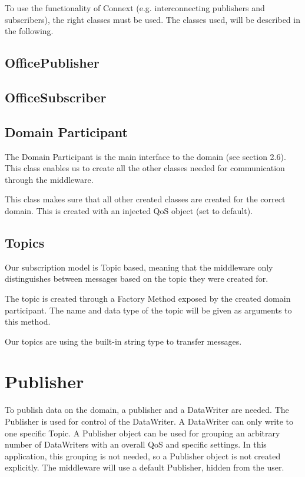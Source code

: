 To use the functionality of Connext (e.g. interconnecting publishers and subscribers), the right classes must be used. The classes used, will be described in the following. 

\subsection{OfficePublisher}

\subsection{OfficeSubscriber}

\subsection{Domain Participant}
The Domain Participant is the main interface to the domain (see section 2.6). This class enables us to create all the other classes needed for communication through the middleware.

This class makes sure that all other created classes are created for the correct domain. This is created with an injected QoS object (set to default).

\begin{center}
\end{center}

\subsection{Topics}
Our subscription model is Topic based, meaning that the middleware only distinguishes between messages based on the topic they were created for. 

The topic is created through a Factory Method exposed by the created domain participant. The name and data type of the topic will be given as arguments to this method. 

Our topics are using the built-in string type to transfer messages.

\begin{center}
\end{center}

\section{Publisher}
To publish data on the domain, a publisher and a DataWriter are needed. The Publisher is used for control of the DataWriter. 
A DataWriter can only write to one specific Topic. A Publisher object can be used for grouping an arbitrary number of DataWriters with an overall QoS and specific settings.
In this application, this grouping is not needed, so a Publisher object is not created explicitly. The middleware will use a default Publisher, hidden from the user.

